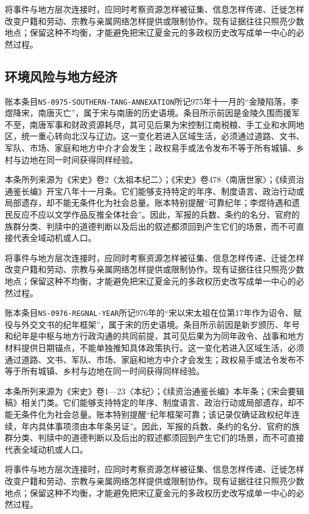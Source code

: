 将事件与地方层次连接时，应同时考察资源怎样被征集、信息怎样传递、迁徙怎样改变户籍和劳动、宗教与亲属网络怎样提供或限制协作。现有证据往往只照亮少数地点；保留这种不均衡，才能避免把宋辽夏金元的多政权历史改写成单一中心的必然过程。

\subsection{环境风险与地方经济}

账本条目\texttt{NS-0975-SOUTHERN-TANG-ANNEXATION}所记975年十一月的“金陵陷落，李煜降宋，南唐灭亡”，属于宋与南唐的历史语境。条目所示前因是金陵久围而援军不至，南唐军事和财政资源耗尽，其可见后果为宋控制江南税粮、手工业和水网地区，统一重心转向北汉与辽边。这一变化若进入区域生活，必须通过道路、文书、军队、市场、家庭和地方中介才会发生；政权易手或法令发布不等于所有城镇、乡村与边地在同一时间获得同样经验。

本条所列来源为《宋史》卷2〈太祖本纪二〉；《宋史》卷478〈南唐世家〉；《续资治通鉴长编》开宝八年十一月条。它们能够支持特定的年序、制度语言、政治行动或局部遗存，却不能无条件化为社会总量。账本特别提醒“可靠纪年；李煜待遇和遗民反应不应以文学作品反推全体社会”。因此，军报的兵数、条约的名分、官府的族群分类、判牍中的道德判断以及后出的叙述都须回到产生它们的场景，而不可直接代表全域动机或人口。

将事件与地方层次连接时，应同时考察资源怎样被征集、信息怎样传递、迁徙怎样改变户籍和劳动、宗教与亲属网络怎样提供或限制协作。现有证据往往只照亮少数地点；保留这种不均衡，才能避免把宋辽夏金元的多政权历史改写成单一中心的必然过程。

账本条目\texttt{NS-0976-REGNAL-YEAR}所记976年的“宋以宋太祖在位第17年作为诏令、赋役与外交文书的纪年框架”，属于宋的历史语境。条目所示前因是新岁颁历、年号和纪年是中枢与地方行政沟通的共同前提，其可见后果为为同年政令、战事和地方材料提供日期锚点，不能单独推知具体政策执行。这一变化若进入区域生活，必须通过道路、文书、军队、市场、家庭和地方中介才会发生；政权易手或法令发布不等于所有城镇、乡村与边地在同一时间获得同样经验。

本条所列来源为《宋史》卷1—23〈本纪〉；《续资治通鉴长编》本年条；《宋会要辑稿》相关门类。它们能够支持特定的年序、制度语言、政治行动或局部遗存，却不能无条件化为社会总量。账本特别提醒“纪年框架可靠；该记录仅确证政权纪年连续，年内具体事项须由本年条另证”。因此，军报的兵数、条约的名分、官府的族群分类、判牍中的道德判断以及后出的叙述都须回到产生它们的场景，而不可直接代表全域动机或人口。

将事件与地方层次连接时，应同时考察资源怎样被征集、信息怎样传递、迁徙怎样改变户籍和劳动、宗教与亲属网络怎样提供或限制协作。现有证据往往只照亮少数地点；保留这种不均衡，才能避免把宋辽夏金元的多政权历史改写成单一中心的必然过程。

